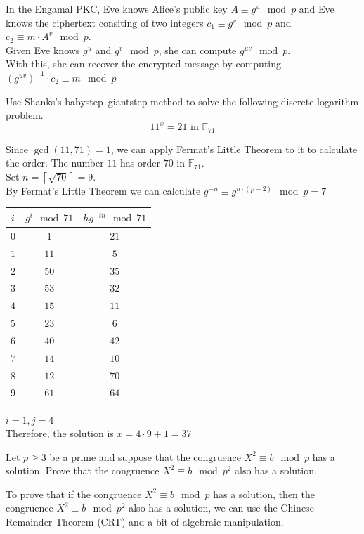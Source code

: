 \documentclass[12pt]{article}
\begin{document}
\solution
In the Engamal PKC, Eve knows Alice's public key $A\equiv g^u\mod{p}$ and Eve knows the ciphertext consiting of two integers $c_1\equiv g^v\mod{p}$ and $c_2\equiv m\cdot A^v\mod{p}$.\\
Given Eve knows $g^u$ and $g^v\mod{p}$, she can compute $g^{uv}\mod{p}$.\\
With this, she can recover the encrypted message by computing $\left(g^{uv}\right)^{-1}\cdot c_2\equiv m\mod{p}$

\problem Use Shanks’s babystep–giantstep method to solve the following discrete logarithm problem.
\[11^x=21 \text{ in } \mathbb{F}_{71}\]

\solution
Since $\gcd(11,71)=1$, we can apply Fermat's Little Theorem to it to calculate the order.
The number $11$ has order $70$ in $\mathbb{F}_{71}$.\\
Set $n=\left\lceil\sqrt{70}\right\rceil=9$.\\
By Fermat's Little Theorem we can calculate $g^{-n}\equiv g^{n\cdot(p-2)}\mod{p}=7$

\noindent
\begin{tabular}{|c|c|c|}
    \hline
    $i$ & $g^i\mod{71}$ & $hg^{-in}\mod{71}$  \\
    \hline
    $0$ & $1$ & $21$ \\
    $1$ & $11$ & $5$ \\
    $2$ & $50$ & $35$ \\
    $3$ & $53$ & $32$ \\
    $4$ & $15$ & $11$ \\
    $5$ & $23$ & $6$ \\
    $6$ & $40$ & $42$ \\
    $7$ & $14$ & $10$ \\
    $8$ & $12$ & $70$ \\
    $9$ & $61$ & $64$ \\
    \hline
\end{tabular}

\noindent
$i=1,j=4$\\
Therefore, the solution is $x=4\cdot9 + 1= 37$

\newpage
\problem Let $p\geq3$ be a prime and suppose that the congruence $X^2\equiv b\mod{p}$ has a solution.
Prove that the congruence $X^2\equiv b\mod{p^2}$ also has a solution.

\solution To prove that if the congruence $X^2 \equiv b \mod{p}$ has a solution, then the congruence $X^2 \equiv b \mod{p^2}$ also has a solution, we can use the Chinese Remainder Theorem (CRT) and a bit of algebraic manipulation.
\end{document}
